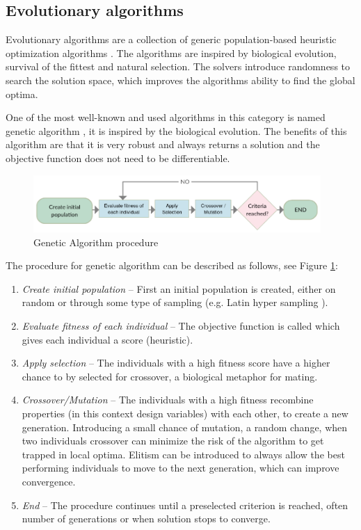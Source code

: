 \subsection{Evolutionary algorithms}
Evolutionary algorithms are a collection of generic population-based heuristic optimization algorithms \cite{Bangert2012}. The algorithms are inspired by biological evolution, survival of the fittest and natural selection. The solvers introduce randomness to search the solution space, which improves the algorithms ability to find the global optima.

One of the most well-known and used algorithms in this category is named genetic algorithm \cite{Goldberg1989}, it is inspired by the biological evolution. The benefits of this algorithm are that it is very robust and always returns a solution and the objective function does not need to be differentiable. 

\begin{figure}
  \includegraphics[width=310pt]{graphics/ga.png}
  \caption{Genetic Algorithm procedure}
  \label{fig:ga}
\end{figure}


The procedure for genetic algorithm can be described as follows, see Figure \ref{fig:ga}:

\begin{enumerate} 
\item \textit{Create initial population }– First an initial population is created, either on random or through some type of sampling (e.g. Latin hyper sampling \cite{10.2307/1268522}).
\item \textit{Evaluate fitness of each individual} – The objective function is called which gives each individual a score (heuristic).
\item \textit{Apply selection} – The individuals with a high fitness score have a higher chance to by selected for crossover, a biological metaphor for mating.
\item \textit{Crossover/Mutation} – The individuals with a high fitness recombine properties (in this context design variables) with each other, to create a new generation. Introducing a small chance of mutation, a random change, when two individuals crossover can minimize the risk of the algorithm to get trapped in local optima. Elitism can be introduced to always allow the best performing individuals to move to the next generation, which can improve convergence. 
\item \textit{End} – The procedure continues until a preselected criterion is reached, often number of generations or when solution stops to converge.
\end{enumerate} 


